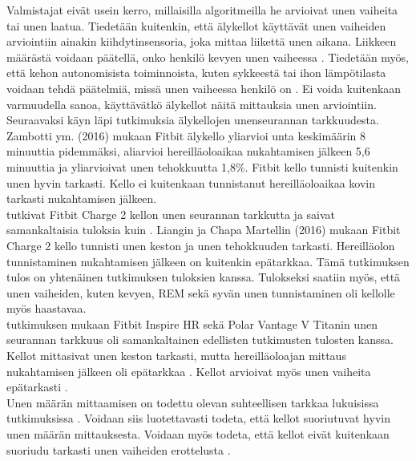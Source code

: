 \documentclass[utf8,bachelor,finnish]{bachelor}
\begin{document}
  Valmistajat eivät usein kerro, millaisilla algoritmeilla he arvioivat unen vaiheita tai unen laatua.
   Tiedetään kuitenkin, että älykellot käyttävät unen vaiheiden arviointiin ainakin kiihdytinsensoria, joka mittaa liikettä unen aikana. Liikkeen määrästä voidaan
    päätellä, onko henkilö kevyen unen vaiheessa \parencite{grifantini_hows_2014,de_zambotti_measures_2016}.
     Tiedetään myös, että kehon autonomisista toiminnoista, kuten sykkeestä tai ihon lämpötilasta voidaan tehdä päätelmiä, missä
      unen vaiheessa henkilö on \parencite{de_zambotti_measures_2016, fonseca_sleep_2015}. Ei voida kuitenkaan varmuudella sanoa, käyttävätkö älykellot näitä mittauksia unen arviointiin.
       Seuraavaksi käyn läpi tutkimuksia älykellojen unenseurannan tarkkuudesta.\\
    
       

   Zambotti ym. (2016) mukaan Fitbit älykello yliarvioi unta keskimäärin
    8 minuuttia pidemmäksi, aliarvioi hereilläoloaikaa nukahtamisen jälkeen 5,6 minuuttia ja yliarvioivat unen tehokkuutta 1,8\%.
     Fitbit kello tunnisti kuitenkin unen hyvin tarkasti.
      Kello ei kuitenkaan tunnistanut hereilläoloaikaa kovin tarkasti nukahtamisen jälkeen.\\
  
  \textcite{liang2018validity} tutkivat Fitbit Charge 2 kellon unen seurannan tarkkutta ja saivat samankaltaisia tuloksia
   kuin \textcite{de_zambotti_measures_2016}. Liangin ja Chapa Martellin (2016) mukaan Fitbit Charge 2 kello tunnisti unen keston
    ja unen tehokkuuden tarkasti. Hereilläolon tunnistaminen nukahtamisen jälkeen on kuitenkin
     epätarkkaa. Tämä tutkimuksen tulos on yhtenäinen \textcite{de_zambotti_measures_2016} tutkimuksen tuloksien kanssa.
      Tulokseksi saatiin myös, että unen vaiheiden, kuten kevyen, REM sekä syvän unen tunnistaminen oli kellolle myös haastavaa.\\
  
  \textcite{chinoy_performance_2022} tutkimuksen mukaan Fitbit Inspire HR sekä Polar Vantage V Titanin unen seurannan tarkkuus oli 
    samankaltainen edellisten tutkimusten tulosten kanssa. Kellot mittasivat unen keston tarkasti,
     mutta hereilläoloajan mittaus nukahtamisen jälkeen oli epätarkkaa \parencite{chinoy_performance_2022}.
      Kellot arvioivat myös unen vaiheita epätarkasti \parencite{chinoy_performance_2022}.\\
  
  Unen määrän mittaamisen on todettu olevan suhteellisen tarkkaa lukuisissa tutkimuksissa
   \parencite{de_zambotti_measures_2016,liang2018validity,chinoy_performance_2022,miller_validation_2022}. Voidaan siis luotettavasti todeta, että kellot suoriutuvat
    hyvin unen määrän mittauksesta. Voidaan myös todeta, että kellot eivät kuitenkaan suoriudu tarkasti unen vaiheiden erottelusta
     \parencite{chinoy_performance_2022,de_zambotti_measures_2016,liang2018validity}.
       
\end{document}
